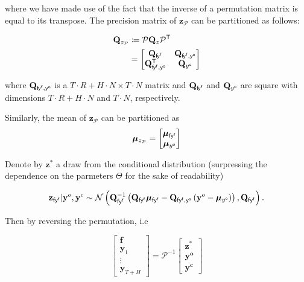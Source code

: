 \documentclass[notitlepage,a4paper,12pt]{article}
\newcommand{\transpose}[1]{{#1}^{\sf{T}}}
\begin{document}
where we have made use of the fact that the inverse of a permutation matrix is equal to its transpose.  The precision matrix of $\mathbf{z}_{\mathcal{P}}$ can be partitioned as follows: 

\begin{align*}
    \mathbf{Q}_{z_{\mathcal{P}}} &\coloneqq  \mathcal{P} \mathbf{Q}_z \transpose{\mathcal{P}} \\
    &= 
    \begin{bmatrix}
        \mathbf{Q}_{\sf{f}\! y^{\sf{f}}} & \mathbf{Q}_{\sf{f}\! y^{\sf{f}}, y^{\sf{o}}} \\ 
        \mathbf{Q}^{\sf{T}}_{\sf{f}\! y^{\sf{f}}, y^{\sf{o}}} & \mathbf{Q}_{y^{\sf{o}}}
    \end{bmatrix}
\end{align*}

where $\mathbf{Q}_{\sf{f}\! y^{\sf{f}}, y^{\sf{o}}}$ is a 
$T\!\cdot\!R + H\!\cdot\!N \times T\!\cdot\!N$ matrix and $\mathbf{Q}_{\sf{f}\! y^{\sf{f}}}$ and $\mathbf{Q}_{y^{\sf{o}}}$ are square with dimensions $T\!\cdot\!R + H\!\cdot\!N$ and $T\!\cdot\!N $, respectively.


Similarly, the mean of $\mathbf{z}_{\mathcal{P}}$ can be partitioned as 
$$
\boldsymbol{\mu}_{z_{\mathcal{P}}} = 
\begin{bmatrix}
    \boldsymbol{\mu}_{\sf{f} y^{\sf{f}}} \\
    \boldsymbol{\mu}_{y^{\sf{o}}}
\end{bmatrix}
$$

Denote by $\mathbf{z}^*$ a draw from the conditional distribution (surpressing the dependence on the parmeters $\Theta$ for the sake of readability)

\begin{equation*}
    \mathbf{z}_{\sf{f} y^{\sf{f}}} | \mathbf{y}^{o}, \mathbf{y}^{c} \sim 
    \mathcal{N}\left(
        \mathbf{Q}^{-1}_{\sf{f} y^{\sf{f}}}\left( \mathbf{Q}_{\sf{f} y^{\sf{f}}}\boldsymbol{\mu}_{\sf{f} y^{\sf{f}}} - \mathbf{Q}_{\sf{f} y^{\sf{f}}, y^{\sf{o}}}\left(\mathbf{y}^o-\boldsymbol{\mu}_{y^{\sf{o}}}\right)\right)
    ,
    \mathbf{Q}_{\sf{f} y^{\sf{f}}}
    \right).
\end{equation*}

Then by reversing the permutation, i.e 

$$
\begin{bmatrix}
    \mathbf{f} \\
    \mathbf{y}_1 \\
    \vdots \\
    \mathbf{y}_{T+H} 
\end{bmatrix}
= 
\mathcal{P}^{-1} 
\begin{bmatrix}
    \mathbf{z}^*\\
    \mathbf{y^{o}} \\
    \mathbf{y^{c}}
\end{bmatrix}
$$
\end{document}
